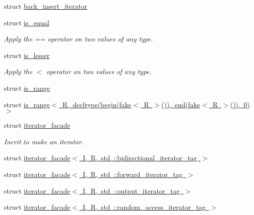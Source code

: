 \begin{DoxyCompactItemize}
\item 
struct \mbox{\hyperlink{structrah_1_1back__insert__iterator}{back\+\_\+insert\+\_\+iterator}}
\item 
struct \mbox{\hyperlink{structrah_1_1is__equal}{is\+\_\+equal}}
\begin{DoxyCompactList}\small\item\em Apply the \textquotesingle{}==\textquotesingle{} operator on two values of any type. \end{DoxyCompactList}\item 
struct \mbox{\hyperlink{structrah_1_1is__lesser}{is\+\_\+lesser}}
\begin{DoxyCompactList}\small\item\em Apply the \textquotesingle{}$<$\textquotesingle{} operator on two values of any type. \end{DoxyCompactList}\item 
struct \mbox{\hyperlink{structrah_1_1is__range}{is\+\_\+range}}
\item 
struct \mbox{\hyperlink{structrah_1_1is__range_3_01_r_00_01decltype_07begin_07fake_3_01_r_01_4_07_08_08_00_01end_07fake_cf1a9a1e2579209cb82001bc9eda23c1}{is\+\_\+range$<$ R, decltype(begin(fake$<$ R $>$()), end(fake$<$ R $>$()), 0)$>$}}
\item 
struct \mbox{\hyperlink{structrah_1_1iterator__facade}{iterator\+\_\+facade}}
\begin{DoxyCompactList}\small\item\em Inerit to make an iterator. \end{DoxyCompactList}\item 
struct \mbox{\hyperlink{structrah_1_1iterator__facade_3_01_i_00_01_r_00_01std_01_1_1bidirectional__iterator__tag_01_4}{iterator\+\_\+facade$<$ I, R, std \+::bidirectional\+\_\+iterator\+\_\+tag $>$}}
\item 
struct \mbox{\hyperlink{structrah_1_1iterator__facade_3_01_i_00_01_r_00_01std_01_1_1forward__iterator__tag_01_4}{iterator\+\_\+facade$<$ I, R, std \+::forward\+\_\+iterator\+\_\+tag $>$}}
\item 
struct \mbox{\hyperlink{structrah_1_1iterator__facade_3_01_i_00_01_r_00_01std_01_1_1output__iterator__tag_01_4}{iterator\+\_\+facade$<$ I, R, std \+::output\+\_\+iterator\+\_\+tag $>$}}
\item 
struct \mbox{\hyperlink{structrah_1_1iterator__facade_3_01_i_00_01_r_00_01std_01_1_1random__access__iterator__tag_01_4}{iterator\+\_\+facade$<$ I, R, std \+::random\+\_\+access\+\_\+iterator\+\_\+tag $>$}}

\end{DoxyCompactItemize}

